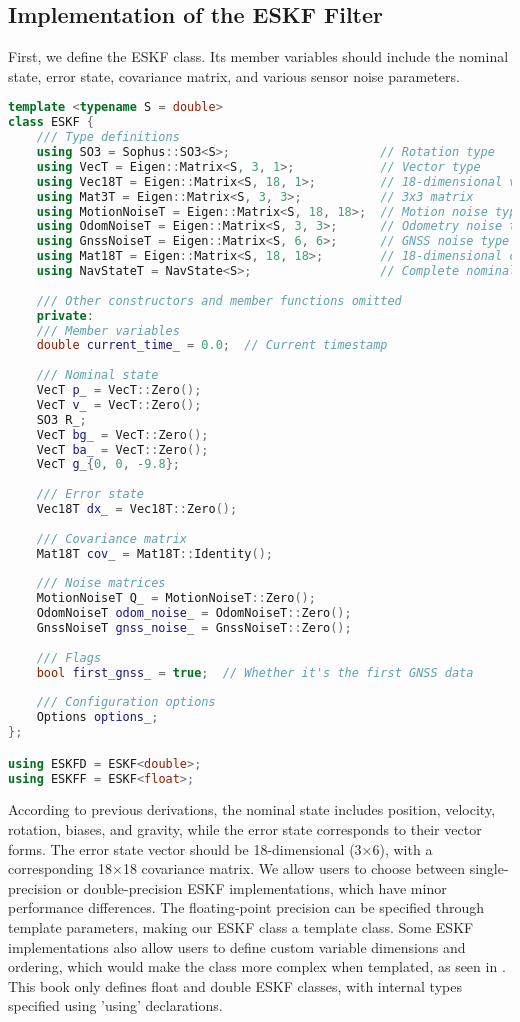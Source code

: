 \subsection{Implementation of the ESKF Filter}

First, we define the ESKF class. Its member variables should include the nominal state, error state, covariance matrix, and various sensor noise parameters.

\begin{lstlisting}[language=c++,caption=src/ch3/eskf.hpp]
template <typename S = double>
class ESKF {
	/// Type definitions
	using SO3 = Sophus::SO3<S>;                     // Rotation type
	using VecT = Eigen::Matrix<S, 3, 1>;            // Vector type
	using Vec18T = Eigen::Matrix<S, 18, 1>;         // 18-dimensional vector
	using Mat3T = Eigen::Matrix<S, 3, 3>;           // 3x3 matrix
	using MotionNoiseT = Eigen::Matrix<S, 18, 18>;  // Motion noise type
	using OdomNoiseT = Eigen::Matrix<S, 3, 3>;      // Odometry noise type
	using GnssNoiseT = Eigen::Matrix<S, 6, 6>;      // GNSS noise type
	using Mat18T = Eigen::Matrix<S, 18, 18>;        // 18-dimensional covariance
	using NavStateT = NavState<S>;                  // Complete nominal state type
	
	/// Other constructors and member functions omitted
	private:
	/// Member variables
	double current_time_ = 0.0;  // Current timestamp
	
	/// Nominal state
	VecT p_ = VecT::Zero();
	VecT v_ = VecT::Zero();
	SO3 R_;
	VecT bg_ = VecT::Zero();
	VecT ba_ = VecT::Zero();
	VecT g_{0, 0, -9.8};
	
	/// Error state
	Vec18T dx_ = Vec18T::Zero();
	
	/// Covariance matrix
	Mat18T cov_ = Mat18T::Identity();
	
	/// Noise matrices
	MotionNoiseT Q_ = MotionNoiseT::Zero();
	OdomNoiseT odom_noise_ = OdomNoiseT::Zero();
	GnssNoiseT gnss_noise_ = GnssNoiseT::Zero();
	
	/// Flags
	bool first_gnss_ = true;  // Whether it's the first GNSS data
	
	/// Configuration options
	Options options_;
};

using ESKFD = ESKF<double>;
using ESKFF = ESKF<float>;
\end{lstlisting}

According to previous derivations, the nominal state includes position, velocity, rotation, biases, and gravity, while the error state corresponds to their vector forms. The error state vector should be 18-dimensional (3×6), with a corresponding 18×18 covariance matrix. We allow users to choose between single-precision or double-precision ESKF implementations, which have minor performance differences. The floating-point precision can be specified through template parameters, making our ESKF class a template class. Some ESKF implementations also allow users to define custom variable dimensions and ordering, which would make the class more complex when templated, as seen in \cite{Hertzberg2013}. This book only defines float and double ESKF classes, with internal types specified using 'using' declarations.
